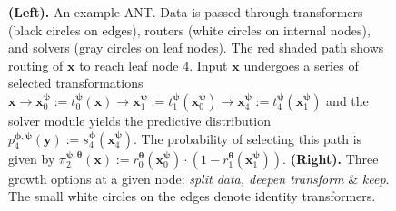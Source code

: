 \begin{figure}[ht]
\begin{subfigure}[]{0.52\linewidth}
	\end{subfigure}
	\caption{\footnotesize \textbf{(Left).} An example ANT. Data is passed through transformers (black circles on edges), routers (white circles on internal nodes), and solvers (gray circles on leaf nodes). The red shaded path shows routing of $\mathbf{x}$ to reach leaf node $4$. Input $\mathbf{x}$ undergoes a series of selected transformations $\mathbf{x}\rightarrow \mathbf{x}^{\boldsymbol{\psi}}_0:=t^{\boldsymbol{\psi}}_0(\mathbf{x})\rightarrow \mathbf{x}^{\boldsymbol{\psi}}_1:=t^{\boldsymbol{\psi}}_1(\mathbf{x}^{\boldsymbol{\psi}}_0) \rightarrow \mathbf{x}^{\boldsymbol{\psi}}_4:=t^{\boldsymbol{\psi}}_4(\mathbf{x}^{\boldsymbol{\psi}}_1)$ and the solver module yields the predictive distribution $p_{4}^{\boldsymbol{\phi}, \boldsymbol{\psi}}(\mathbf{y}):= s^{\boldsymbol{\phi}}_4(\mathbf{x}^{\boldsymbol{\psi}}_4)$. The probability of selecting this path is given by $\pi_{2}^{\boldsymbol{\psi}, \boldsymbol{\theta}}(\mathbf{x}) := r_{0}^{\boldsymbol{\theta}}(\mathbf{x}^{\boldsymbol{\psi}}_0)\cdot(1-r_{1}^{\boldsymbol{\theta}}(\mathbf{x}^{\boldsymbol{\psi}}_1)).$ \textbf{(Right).} Three growth options at a given node: \textit{split data, deepen transform} \& \textit{keep}. The small white circles on the edges denote identity transformers.}
	\label{fig:hierarchy}
\end{figure}


